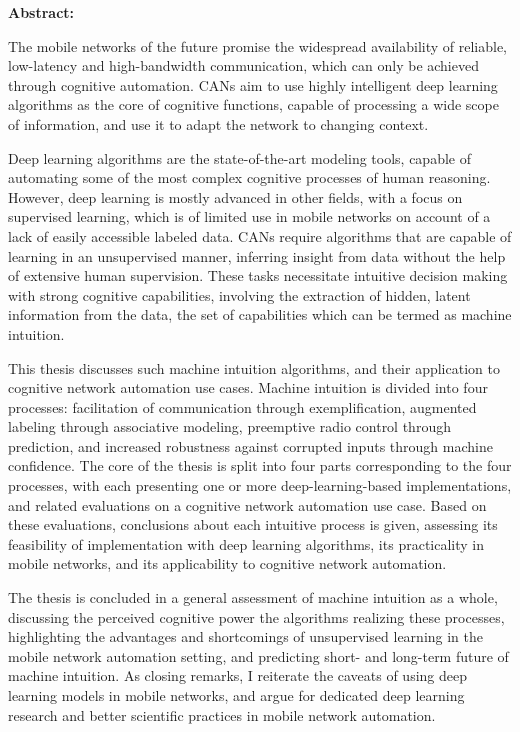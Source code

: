 \thispagestyle{empty}
\vspace*{6\baselineskip}

{\large\textbf{Abstract:} }
\par

The mobile networks of the future promise the widespread availability of reliable, low-latency and high-bandwidth communication, which can only be achieved through cognitive automation.
\acp{CAN} aim to use highly intelligent deep learning algorithms as the core of cognitive functions, capable of processing a wide scope of information, and use it to adapt the network to changing context.

Deep learning algorithms are the state-of-the-art modeling tools, capable of automating some of the most complex cognitive processes of human reasoning.
However, deep learning is mostly advanced in other fields, with a focus on supervised learning, which is of limited use in mobile networks on account of a lack of easily accessible labeled data.
\acp{CAN} require algorithms that are capable of learning in an unsupervised manner, inferring insight from data without the help of extensive human supervision.
These tasks necessitate intuitive decision making with strong cognitive capabilities, involving the extraction of hidden, latent information from the data, the set of capabilities which can be termed as machine intuition.

This thesis discusses such machine intuition algorithms, and their application to cognitive network automation use cases.
Machine intuition is divided into four processes: facilitation of communication through exemplification, augmented labeling through associative modeling, preemptive radio control through prediction, and increased robustness against corrupted inputs through machine confidence.
The core of the thesis is split into four parts corresponding to the four processes, with each presenting one or more deep-learning-based implementations, and related evaluations on a cognitive network automation use case.
Based on these evaluations, conclusions about each intuitive process is given, assessing its feasibility of implementation with deep learning algorithms, its practicality in mobile networks, and its applicability to cognitive network automation.

The thesis is concluded in a general assessment of machine intuition as a whole, discussing the perceived cognitive power the algorithms realizing these processes, highlighting the advantages and shortcomings of unsupervised learning in the mobile network automation setting, and predicting short- and long-term future of machine intuition.
As closing remarks, I reiterate the caveats of using deep learning models in mobile networks, and argue for dedicated deep learning research and better scientific practices in mobile network automation.

\clearpage
